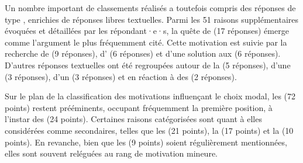 \begin{refsegment}
Un nombre important de classements réalisés a toutefois compris des réponses de type , enrichies de réponses libres textuelles. Parmi les 51 raisons supplémentaires évoquées et détaillées par les répondant·e·s, la quête de  (17 réponses) émerge comme l'argument le plus fréquemment cité. Cette motivation est suivie par la recherche de  (9 réponses), d' (6 réponses) et d'une solution aux  (6 réponses). D'autres réponses textuelles ont été regroupées autour de la  (5 réponses), d'une  (3 réponses), d'un  (3 réponses) et en réaction à des  (2 réponses).%

Sur le plan de la classification des motivations influençant le choix modal, les  (72 points) restent prééminents, occupant fréquemment la première position, à l'instar des  (24 points). Certaines raisons catégorisées sont quant à elles considérées comme secondaires, telles que les  (21 points), la  (17 points) et la  (10 points). En revanche, bien que les  (9 points) soient régulièrement mentionnées, elles sont souvent reléguées au rang de motivation mineure.%


\end{refsegment}
